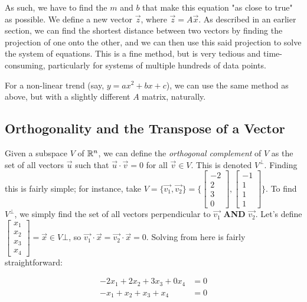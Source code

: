 \documentclass[12pt]{article}
\begin{document}
As such, we have to find the $m$ and $b$ that make this equation "as close to true" as possible. We define a new vector $\vec{z}$, where $\vec{z} = A\vec
x$. As described in an earlier section, we can find the shortest distance between two vectors by finding the projection of one onto the other, and we can then use this said projection to solve the system of equations. This is a fine method, but is very tedious and time-consuming, particularly for systems of multiple hundreds of data points.

For a non-linear trend (say, $y=ax^2+bx+c$), we can use the same method as above, but with a slightly different $A$ matrix, naturally.


\subsection{Orthogonality and the Transpose of a Vector}

Given a subspace $V$ of $\mathbb{R}^n$, we can define the \textit{orthogonal complement} of $V$ as the set of all vectors $\vec{u}$ such that $\vec{u}\cdot\vec{v} = 0$ for all $\vec{v}\in V$. This is denoted $V^\bot$. Finding this is fairly simple; for instance, take $V = \{\vec{v_1}, \vec{v_2}\}= \{\begin{bmatrix}-2\\
    2\\
    3\\
    0
\end{bmatrix}, \begin{bmatrix}-1\\
    1\\
    1\\
    1
\end{bmatrix}
\}$. To find $V^\bot$, we simply find the set of all vectors perpendicular to $\vec{v_1}$ \textbf{AND} $\vec{v_2}$. Let's define $\begin{bmatrix}
    x_1\\
    x_2\\
    x_3\\
    x_4\end{bmatrix} = \vec{x} \in V\bot$, so $\vec{v_1}\cdot\vec{x} = \vec{v_2}\cdot\vec{x} = 0$. Solving from here is fairly straightforward:

\begin{equation}
    \begin{split}
        -2x_1 + 2x_2 + 3x_3 +0x_4&= 0\\
        -x_1 + x_2 + x_3 +x_4 &= 0\\
    \end{split}
\end{equation}
\end{document}
